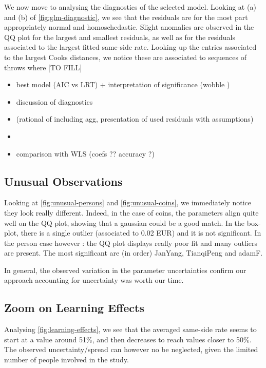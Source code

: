 \documentclass[a4paper, 12pt,oneside]{article}
\begin{document}
		We now move to analysing the diagnostics of the selected model. Looking at (a) and (b) of \ref{fig:glm-diagnostic}, we see that the residuals are for the most part appropriately normal and homoschedastic. Slight anomalies are observed in the QQ plot for the largest and smallest residuals, as well as for the residuals associated to the largest fitted same-side rate. Looking up the entries associated to the largest Cooks distances, we notice these are associated to sequences of throws where [TO FILL]
			\begin{itemize}
				\item best model (AIC vs LRT) + interpretation of significance (wobble )
				\item discussion of diagnostics 
				\item (rational of including agg, presentation of used residuals with assumptions)
				\item 
				\item comparison with WLS (coefs ?? accuracy ?)
			\end{itemize}

		\subsection{Unusual Observations}
			Looking at \ref{fig:unusual-persons} and \ref{fig:unusual-coins}, we immediately notice they look really different. Indeed, in the case of coins, the parameters align quite well on the QQ plot, showing that a gaussian could be a good match. In the box-plot, there is a single outlier (associated to 0.02 EUR) and it is not significant. In the person case however : the QQ plot displays really poor fit and  many outliers are present. The most significant are (in order) JanYang, TianqiPeng and adamF. 

			In general, the observed variation in the parameter uncertainties confirm our approach accounting for uncertainty was worth our time. 
		\subsection{Zoom on Learning Effects}\label{sec:disc-learning-effects}
			Analysing \ref{fig:learning-effects}, we see that the averaged same-side rate seems to start at a value around 51\%, and then decreases to reach values closer to 50\%. The observed uncertainty/spread can however no be neglected, given the limited number of people involved in the study. 
			
\end{document}
